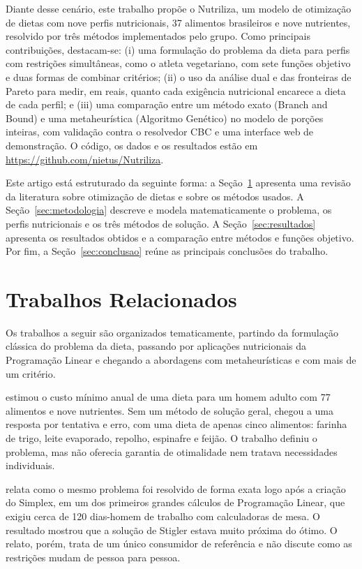 \documentclass[12pt]{article}
\begin{document}
Diante desse cenário, este trabalho propõe o Nutriliza, um modelo de otimização de
dietas com nove perfis nutricionais, 37 alimentos brasileiros e nove nutrientes,
resolvido por três métodos implementados pelo grupo. Como principais contribuições,
destacam-se: (i) uma formulação do problema da dieta para perfis com restrições
simultâneas, como o atleta vegetariano, com sete funções objetivo e duas formas de
combinar critérios; (ii) o uso da análise dual e das fronteiras de Pareto para medir,
em reais, quanto cada exigência nutricional encarece a dieta de cada perfil; e (iii)
uma comparação entre um método exato (Branch and Bound) e uma metaheurística
(Algoritmo Genético) no modelo de porções inteiras, com validação contra o resolvedor
CBC e uma interface web de demonstração. O código, os dados e os resultados estão em
\url{https://github.com/nietus/Nutriliza}.

Este artigo está estruturado da seguinte forma: a Seção~\ref{sec:trabalhos} apresenta
uma revisão da literatura sobre otimização de dietas e sobre os métodos usados. A
Seção~\ref{sec:metodologia} descreve e modela matematicamente o problema, os perfis
nutricionais e os três métodos de solução. A Seção~\ref{sec:resultados} apresenta os
resultados obtidos e a comparação entre métodos e funções objetivo. Por fim, a
Seção~\ref{sec:conclusao} reúne as principais conclusões do trabalho.

\section{Trabalhos Relacionados}\label{sec:trabalhos}

Os trabalhos a seguir são organizados tematicamente, partindo da formulação clássica do
problema da dieta, passando por aplicações nutricionais da Programação Linear e
chegando a abordagens com metaheurísticas e com mais de um critério.

\cite{stigler1945} estimou o custo mínimo anual de uma dieta para um homem adulto com
77 alimentos e nove nutrientes. Sem um método de solução geral, chegou a uma resposta
por tentativa e erro, com uma dieta de apenas cinco alimentos: farinha de trigo, leite
evaporado, repolho, espinafre e feijão. O trabalho definiu o problema, mas não oferecia
garantia de otimalidade nem tratava necessidades individuais.

\cite{dantzig1990} relata como o mesmo problema foi resolvido de forma exata logo após a
criação do Simplex, em um dos primeiros grandes cálculos de Programação Linear, que
exigiu cerca de 120 dias-homem de trabalho com calculadoras de mesa. O resultado mostrou
que a solução de Stigler estava muito próxima do ótimo. O relato, porém, trata de um
único consumidor de referência e não discute como as restrições mudam de pessoa para
pessoa.
\end{document}
